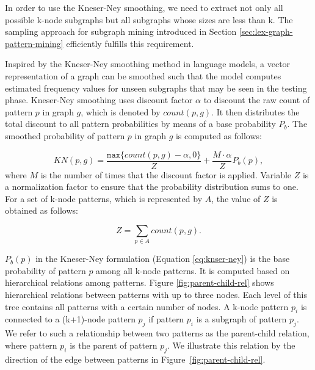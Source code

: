 In order to use the Kneser-Ney smoothing, we need to extract not only all possible k-node subgraphs but all subgraphs whose sizes are less than k. 
The sampling approach for subgraph mining introduced in Section \ref{sec:lex-graph-pattern-mining} efficiently fulfills this requirement. 

Inspired by the \mbox{Kneser-Ney} smoothing  method in language models, a vector representation of a graph can be smoothed such that the model computes estimated frequency values for unseen subgraphs that may be seen in the testing phase. 
\mbox{Kneser-Ney} smoothing uses discount factor $\alpha$ to discount the raw count of pattern $p$ in  graph $g$, which is denoted by $count(p,g)$. 
It then distributes the total discount to all pattern probabilities by means of a base probability $P_b$.
The smoothed probability of pattern $p$ in graph $g$ is computed as follows:

\begin{equation}
  \label{eq:knser-ney}
  KN(p,g) = \frac{\mathtt{max} \lbrace  count(p,g)-\alpha, 0 \rbrace }{Z} + \frac{M \cdot \alpha}{Z}P_b(p),
\end{equation}
where $M$ is the number of times that the discount factor is applied. 
Variable $Z$ is a normalization factor to ensure that the probability distribution sums to one.  
For a set of k-node patterns, which is represented by $A$, the value of $Z$ is obtained as follows:

\begin{equation}
Z = \sum_{p \in A} count(p,g). 
\end{equation}

$P_b(p)$ in the \mbox{Kneser-Ney} formulation (Equation \ref{eq:knser-ney}) is the base probability of pattern $p$ among all k-node patterns. 
It is computed based on hierarchical relations among patterns. 
Figure \ref{fig:parent-child-rel} shows hierarchical 
relations between patterns with up to three nodes. 
Each level of this tree contains all patterns with a certain number of nodes. 
A k-node pattern $p_i$ is connected to a (k+1)-node pattern $p_j$ if pattern $p_i$ is a subgraph of pattern $p_j$. 
We refer to such a relationship between two patterns as the parent-child relation, where pattern $p_i$ is the parent of pattern $p_j$. 
We illustrate this relation by the direction of the edge between patterns in Figure~\ref{fig:parent-child-rel}. 


